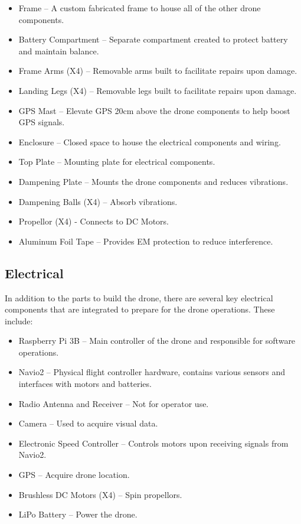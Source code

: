 \documentclass[12pt]{article}
\begin{document}
\begin{itemize}
    \item Frame – A custom fabricated frame to house all of the other drone components.
    \item Battery Compartment – Separate compartment created to protect battery and maintain balance.
    \item Frame Arms (X4) – Removable arms built to facilitate repairs upon damage.
    \item Landing Legs (X4) – Removable legs built to facilitate repairs upon damage.
    \item GPS Mast – Elevate GPS 20cm above the drone components to help boost GPS signals.
    \item Enclosure – Closed space to house the electrical components and wiring.
    \item Top Plate – Mounting plate for electrical components.
    \item Dampening Plate – Mounts the drone components and reduces vibrations.
    \item Dampening Balls (X4) – Absorb vibrations.
    \item Propellor (X4) - Connects to DC Motors.
    \item Aluminum Foil Tape – Provides EM protection to reduce interference.
\end{itemize}

\subsection{Electrical}

In addition to the parts to build the drone, there are several key electrical components that are integrated to prepare for the drone operations. These include:

\begin{itemize} \label{subsec:Electrical}
    \item Raspberry Pi 3B – Main controller of the drone and responsible for software operations.
    \item Navio2 – Physical flight controller hardware, contains various sensors and interfaces with motors and batteries.
    \item Radio Antenna and Receiver – Not for operator use.
    \item Camera – Used to acquire visual data.
    \item Electronic Speed Controller – Controls motors upon receiving signals from Navio2.
    \item GPS – Acquire drone location.
    \item Brushless DC Motors (X4) – Spin propellors.
    \item LiPo Battery – Power the drone.
\end{itemize}
\end{document}
